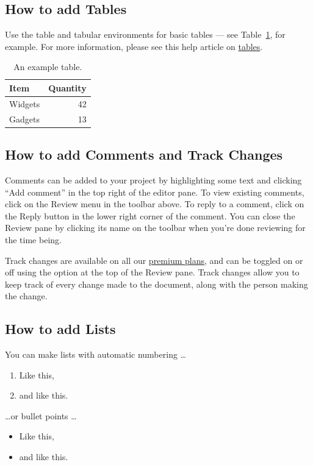 \documentclass[a4paper]{article}
\begin{document}
\subsection{How to add Tables}

Use the table and tabular environments for basic tables --- see Table~\ref{tab:widgets}, for example. For more information, please see this help article on \href{https://www.overleaf.com/learn/latex/tables}{tables}. 

\begin{table}
\centering
\begin{tabular}{l|r}
Item & Quantity \\\hline
Widgets & 42 \\
Gadgets & 13
\end{tabular}
\caption{\label{tab:widgets}An example table.}
\end{table}

\subsection{How to add Comments and Track Changes}

Comments can be added to your project by highlighting some text and clicking ``Add comment'' in the top right of the editor pane. To view existing comments, click on the Review menu in the toolbar above. To reply to a comment, click on the Reply button in the lower right corner of the comment. You can close the Review pane by clicking its name on the toolbar when you're done reviewing for the time being.

Track changes are available on all our \href{https://www.overleaf.com/user/subscription/plans}{premium plans}, and can be toggled on or off using the option at the top of the Review pane. Track changes allow you to keep track of every change made to the document, along with the person making the change. 

\subsection{How to add Lists}

You can make lists with automatic numbering \dots

\begin{enumerate}
\item Like this,
\item and like this.
\end{enumerate}
\dots or bullet points \dots
\begin{itemize}
\item Like this,
\item and like this.
\end{itemize}
\end{document}
